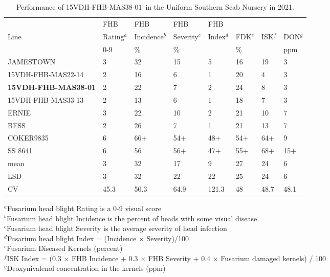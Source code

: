 \documentclass[12pt, letterpaper]{article}
\newcommand{\lin}{15VDH-FHB-MAS38-01~}
\begin{document}
\begin{landscape}
\begin{table}[ht]
\caption{Performance of \lin in the Uniform Southern Scab Nursery in 2021.}
\label{ussn21}
\begin{tabular}{llllllll}
  \hline
 & FHB & FHB & FHB & FHB &  &  &  \\ 
Line & Rating$^a$ & Incidence$^b$ & Severity$^c$ & Index$^d$ & FDK$^e$ & ISK$^f$ & DON$^g$ \\ 
 & 0-9 & \% & \% &  & \% &  & ppm \\ 
  \hline
  JAMESTOWN & 3 & 32 & 15 & 5 & 16 & 19 & 3 \\ 
  15VDH-FHB-MAS22-14 & 2 & 16 & 6 & 1 & 20 & 4 & 3 \\ 
  \textbf{15VDH-FHB-MAS38-01} & 2 & 22 & 7 & 2 & 24 & 8 & 3 \\ 
  15VDH-FHB-MAS33-13 & 2 & 13 & 6 & 1 & 18 & 7 & 3 \\ 
  ERNIE & 3 & 22 & 10 & 2 & 21 & 10 & 7 \\ 
  BESS & 2 & 26 & 7 & 1 & 21 & 13 & 7 \\ 
  COKER9835 & 6 & 66+ & 54+ & 48+ & 54+ & 64+ & 9 \\ 
  SS 8641 & 6 & 56 & 56+ & 47+ & 55+ & 68+ & 15+ \\ 
   \hline
  mean & 3 & 32 & 17 & 9 & 27 & 24 & 6 \\ 
  LSD & 3 & 32 & 22 & 22 & 25 & 24 & 6 \\ 
  CV & 45.3 & 50.3 & 64.9 & 121.3 & 48 & 48.7 & 48.1 \\ 
   \hline
\end{tabular}

\raggedright{
\footnotesize
$^a$Fusarium head blight Rating is a 0-9 visual score  \\
$^b$Fusarium head blight Incidence is the percent of heads with some visual disease \\
$^c$Fusarium head blight Severity is the average severity of head infection  \\
$^d$Fusarium head blight Index = (Incidence $\times$ Severity)/100 \\
$^e$Fusarium Diseased Kernels (percent) \\
$^f$ISK Index = (0.3 $\times$ FHB Incidence + 0.3 $\times$ FHB Severity + 0.4 $\times$ Fusarium damaged kernels) / 100\\
$^g$Deoxynivalenol concentration in the kernels (ppm)\\
}
\end{table}


\newpage



\end{landscape}
\end{document}

